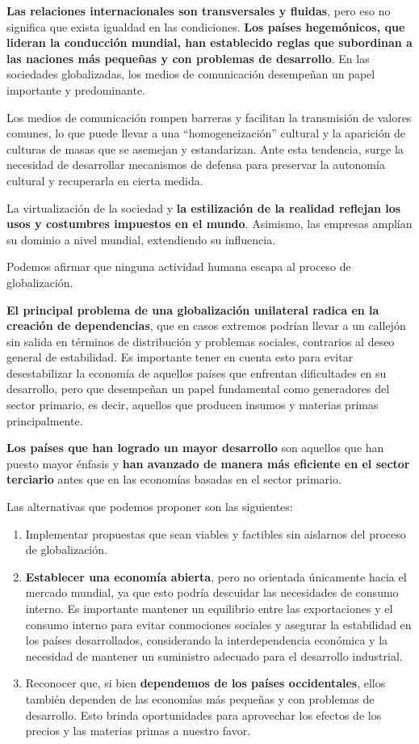 \documentclass[
  jou,
  floatsintext,
  longtable,
  a4paper,
  nolmodern,
  notxfonts,
  notimes,
  12pt,
  colorlinks=true,linkcolor=blue,citecolor=blue,urlcolor=blue]{apa7}
\begin{document}
\textbf{Las relaciones internacionales son transversales y fluidas},
pero eso no significa que exista igualdad en las condiciones.
\textbf{Los países hegemónicos, que lideran la conducción mundial, han
establecido reglas que subordinan a las naciones más pequeñas y con
problemas de desarrollo}. En las sociedades globalizadas, los medios de
comunicación desempeñan un papel importante y predominante.

Los medios de comunicación rompen barreras y facilitan la transmisión de
valores comunes, lo que puede llevar a una ``homogeneización'' cultural
y la aparición de culturas de masas que se asemejan y estandarizan. Ante
esta tendencia, surge la necesidad de desarrollar mecanismos de defensa
para preservar la autonomía cultural y recuperarla en cierta medida.

La virtualización de la sociedad y \textbf{la estilización de la
realidad reflejan los usos y costumbres impuestos en el mundo}.
Asimismo, las empresas amplían su dominio a nivel mundial, extendiendo
su influencia.

Podemos afirmar que ninguna actividad humana escapa al proceso de
globalización.

\textbf{El principal problema de una globalización unilateral radica en
la creación de dependencias}, que en casos extremos podrían llevar a un
callejón sin salida en términos de distribución y problemas sociales,
contrarios al deseo general de estabilidad. Es importante tener en
cuenta esto para evitar desestabilizar la economía de aquellos países
que enfrentan dificultades en su desarrollo, pero que desempeñan un
papel fundamental como generadores del sector primario, es decir,
aquellos que producen insumos y materias primas principalmente.

\textbf{Los países que han logrado un mayor desarrollo} son aquellos que
han puesto mayor énfasis y \textbf{han avanzado de manera más eficiente
en el sector terciario} antes que en las economías basadas en el sector
primario.

Las alternativas que podemos proponer son las siguientes:

\begin{enumerate}
\def\labelenumi{\arabic{enumi}.}
\item
  Implementar propuestas que sean viables y factibles sin aislarnos del
  proceso de globalización.
\item
  \textbf{Establecer una economía abierta}, pero no orientada únicamente
  hacia el mercado mundial, ya que esto podría descuidar las necesidades
  de consumo interno. Es importante mantener un equilibrio entre las
  exportaciones y el consumo interno para evitar conmociones sociales y
  asegurar la estabilidad en los países desarrollados, considerando la
  interdependencia económica y la necesidad de mantener un suministro
  adecuado para el desarrollo industrial.
\item
  Reconocer que, si bien \textbf{dependemos de los países occidentales},
  ellos también dependen de las economías más pequeñas y con problemas
  de desarrollo. Esto brinda oportunidades para aprovechar los efectos
  de los precios y las materias primas a nuestro favor.
\end{enumerate}
\end{document}
